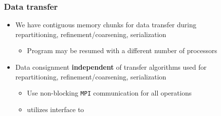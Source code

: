 \begin{frame}
\frametitle{Data transfer}

\begin{itemize}
\item We have contiguous memory chunks for data transfer during\\ repartitioning, refinement/coarsening, serialization
  \begin{itemize}
  \item Program may be resumed with a different number of processors
  \end{itemize}
\end{itemize}

\vfill

\begin{itemize}
\item Data consignment \textbf{independent} of transfer algorithms used for\\ repartitioning, refinement/coarsening, serialization
  \begin{itemize}
  \item Use non-blocking \texttt{MPI} communication for all operations
  \item \dealii{} utilizes interface to \pforest{} \cite{burstedde}
  \end{itemize}
\end{itemize}
\end{frame}